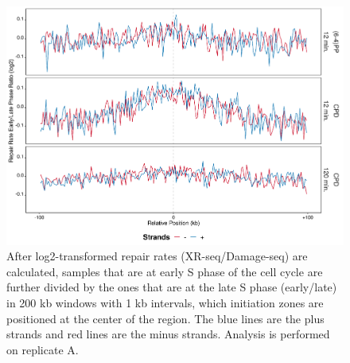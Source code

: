 \begin{figure}[H]
\begin{center}
\includegraphics[width=\textwidth]{Chapters/7_appendix/figures/supfig40}
\caption[Repair rate early/late ratio of initiation zones in 200 kb (replicate A).]{After log2-transformed repair rates (XR-seq/Damage-seq) are calculated, samples that are at early S phase of the cell cycle are further divided by the ones that are at the late S phase (early/late) in 200 kb windows with 1 kb intervals, which initiation zones are positioned at the center of the region. The blue lines are the plus strands and red lines are the minus strands. Analysis is performed on replicate A.}
\label{supfig:rrel200inzonesA}
\end{center}
\end{figure}

